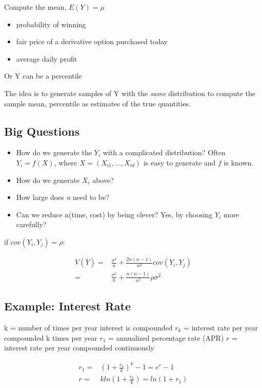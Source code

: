\documentclass[11pt]{article}
\begin{document}
Compute the mean, \(E(Y) = \mu\)
\begin{itemize}
\item probability of winning
\item fair price of a derivative option purchased today
\item average daily profit
\end{itemize}

Or Y can be a percentile

The idea is to generate samples of Y with the \emph{same} distribution to compute the
sample mean, percentile as estimates of the true quantities.

\subsection{Big Questions}
\label{sec:orga4360df}

\begin{itemize}
\item How do we generate the \(Y_i\) with a complicated distribution? Often \(Y_i =
  f(X)\), where \(X = (X_{i1}, ..., X_{id})\) is easy to generate and \(f\) is known.
\item How do we generate \(X_i\) above?
\item How large does \emph{n} need to be?
\item Can we reduce n(time, cost) by being clever?
Yes, by choosing \(Y_i\) more carefully?
\end{itemize}

if \(cov(Y_i, Y_j) = \rho\):

\begin{equation}
\begin{split}
V(\bar{Y}) = & \frac{\sigma^2}{n} + \frac{2n(n - 1)}{n^2} cov(Y_i, Y_j)\\
= & \frac{\sigma^2}{n} + \frac{n(n - 1)}{n^2} \rho \sigma^2
\end{split}
\end{equation}

\subsection{Example: Interest Rate}
\label{sec:orgafb5282}

k = number of times per year interest is compounded
\(r_k\) = interest rate per year compounded k times per year
\(r_1\) = annualized percentage rate (APR)
\(r\) = interest rate per year compounded continuously

\begin{equation}
\begin{split}
r_1 = & (1 + \frac{r_k}{k})^k - 1 = e^r - 1\\
r = & k ln(1 + \frac{r_k}{k}) = ln(1 + r_1)
\end{split}
\end{equation}
\end{document}
